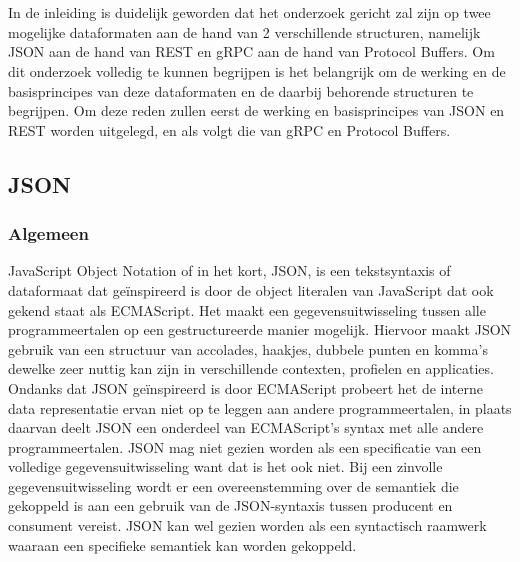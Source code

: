 \chapter{}
\label{ch:stand-van-zaken}



In de inleiding is duidelijk geworden dat het onderzoek gericht zal zijn op twee mogelijke dataformaten aan de hand van 2 verschillende structuren, namelijk JSON aan de hand van REST en gRPC aan de hand van Protocol Buffers. Om dit onderzoek volledig te kunnen begrijpen is het belangrijk om de werking en de basisprincipes van deze dataformaten en de daarbij behorende structuren te begrijpen. Om deze reden zullen eerst de werking en basisprincipes van JSON en REST worden uitgelegd, en als volgt die van gRPC en Protocol Buffers.

\section{JSON}
\label{sec:JSON}

\subsection{Algemeen}
\label{subsec:Algemeen}

JavaScript Object Notation of in het kort, JSON, is een tekstsyntaxis of dataformaat dat geïnspireerd is door de object literalen van JavaScript dat ook gekend staat als ECMAScript. Het maakt een gegevensuitwisseling tussen alle programmeertalen op een gestructureerde manier mogelijk. Hiervoor maakt JSON gebruik van een structuur van accolades, haakjes, dubbele punten en komma's dewelke zeer nuttig kan zijn in verschillende contexten, profielen en applicaties. Ondanks dat JSON geïnspireerd is door ECMAScript probeert het de interne data representatie ervan niet op te leggen aan andere programmeertalen, in plaats daarvan deelt JSON een onderdeel van ECMAScript's syntax met alle andere programmeertalen. JSON mag niet gezien worden als een specificatie van een volledige gegevensuitwisseling want dat is het ook niet. Bij een zinvolle gegevensuitwisseling wordt er een overeenstemming over de semantiek die gekoppeld is aan een gebruik van de JSON-syntaxis tussen producent en consument vereist. JSON kan wel gezien worden als een syntactisch raamwerk waaraan een specifieke semantiek kan worden gekoppeld.


